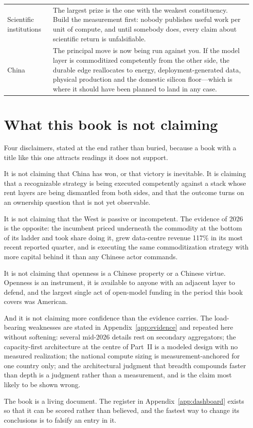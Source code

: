 \begin{table}[htbp]
\begin{tabular}{@{}p{28mm}p{118mm}@{}}
\addlinespace
Scientific institutions & The largest prize is the one with the weakest constituency. Build the measurement first: nobody publishes useful work per unit of compute, and until somebody does, every claim about scientific return is unfalsifiable. \\
\addlinespace
China & The principal move is now being run against you. If the model layer is commoditized competently from the other side, the durable edge reallocates to energy, deployment-generated data, physical production and the domestic silicon floor---which is where it should have been planned to land in any case. \\
\bottomrule
\end{tabular}
\end{table}

\section{What this book is not claiming}
\label{sec:summary-limits}

Four disclaimers, stated at the end rather than buried, because a book with a title like this one attracts readings it does not support.

It is not claiming that China has won, or that victory is inevitable. It is claiming that a recognizable strategy is being executed competently against a stack whose rent layers are being dismantled from both sides, and that the outcome turns on an ownership question that is not yet observable.

It is not claiming that the West is passive or incompetent. The evidence of 2026 is the opposite: the incumbent priced underneath the commodity at the bottom of its ladder and took share doing it, grew data-centre revenue 117\% in its most recent reported quarter, and is executing the same commoditization strategy with more capital behind it than any Chinese actor commands.

It is not claiming that openness is a Chinese property or a Chinese virtue. Openness is an instrument, it is available to anyone with an adjacent layer to defend, and the largest single act of open-model funding in the period this book covers was American.

And it is not claiming more confidence than the evidence carries. The load-bearing weaknesses are stated in Appendix~\ref{app:evidence} and repeated here without softening: several mid-2026 details rest on secondary aggregators; the capacity-first architecture at the centre of Part~II is a modeled design with no measured realization; the national compute sizing is measurement-anchored for one country only; and the architectural judgment that breadth compounds faster than depth is a judgment rather than a measurement, and is the claim most likely to be shown wrong.

The book is a living document. The register in Appendix~\ref{app:dashboard} exists so that it can be scored rather than believed, and the fastest way to change its conclusions is to falsify an entry in it.
